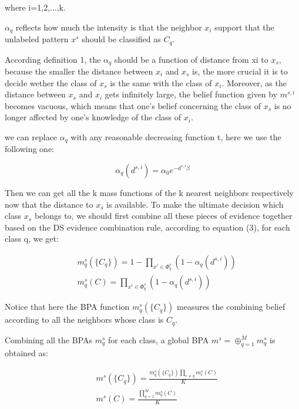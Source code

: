\documentclass[runningheads]{llncs}
\begin{document}
where i=1,2,...,k.

\begin{definition}
 $\alpha _q$ reflects how much the intensity is that the neighbor $x_i$ support that the unlabeled pattern $x^s$ should be classified as $C_q$.
\end{definition}

According definition 1, the $\alpha _q$ should be a function of distance from xi to $x_s$, because the smaller the distance between  $x_i$ and $x_s$ is,  the more crucial it is to decide wether the class of $x_s$ is the same with the class of $x_i$. Moreover, as the distance between $x_s$ and $x_i$ gets infinitely large, the belief function given by $m^{s,i}$ becomes vacuous, which means that one’s belief concerning the class of $x_s$ is no longer affected by one’s knowledge of the class of $x_i$.

we can replace $\alpha _q$ with any reasonable decreasing function t, here we use the following one:

\begin{equation}
\alpha_q (d^{s,i})= \alpha_0 e^{- d^{s,i} {\beta}}
\end{equation}

Then we can get all the k mass functions of the k nearest neighbors respectively now that the distance to $x_s$ is available. To make the ultimate decision which class $x_s$ belongs to, we should first combine all these pieces of evidence together based on the DS evidence combination rule, according to equation (3), for each class q, we get:

\begin{equation}
\begin{split}
&\ m^{s} _q( \{C_q\}) = 1- \prod_{x^i\in \Phi^s _q } (1-\alpha_q(d^{s,i}))
\\
&\ m^{s} _q(C) = \prod_{x^i\in \Phi^s _q } (1-\alpha_q(d^{s,i}))
\end{split}
\end{equation}

Notice that here the BPA function $m^s_q (\{ C_q \})$ measures the combining belief according to all the neighbors whose class is $C_q$.

Combining all the BPAs $m^s_q$ for each class, a global BPA $m^s=\oplus ^M _{q=1} m^s_q$ is obtained as:

\begin{equation}
\begin{split}
&\ m^{s} ( \{C_q\}) = \frac{m^{s}_q ( \{C_q\})
\prod_{r\neq q} m^s_r(C)}{K}
\\
&\ m^{s} ( C) = \frac{
\prod_{q=1} ^M m^s_q(C)}{K}
\end{split}
\end{equation}
\end{document}
